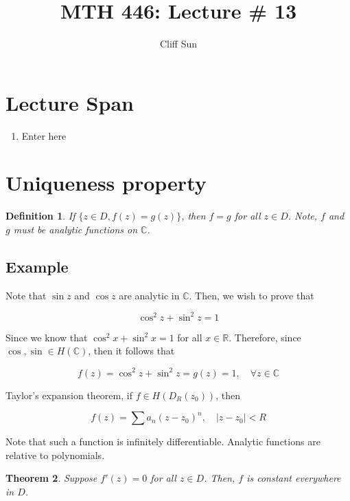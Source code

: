 \documentclass{article}
\title{MTH 446: Lecture \# 13}
\author{Cliff Sun}
\newtheorem{theorem}{Theorem}[section]
\newtheorem{definition}[theorem]{Definition}
\newtheorem{one minute paper}[theorem]{One Minute Paper}
\begin{document}
\maketitle

\section*{Lecture Span}
\begin{enumerate}
    \item Enter here
\end{enumerate}

\section*{Uniqueness property}

\begin{definition}
    If $\{z \in D, f(z) = g(z)\}$, then $f=g$ for all $z \in D$. Note, $f$ and $g$ must be analytic functions on $\mathbb{C}$. 
\end{definition}

\subsection*{Example}

Note that $\sin z$ and $\cos z$ are analytic in $\mathbb{C}$. Then, we wish to prove that 

\begin{equation}
    \cos^2 z+ \sin^2 z= 1
\end{equation}

Since we know that $\cos^2 x + \sin^2 x = 1$ for all $x\in \mathbb{R}$. Therefore, since $\cos,\sin \in H(\mathbb{C})$, then it follows that 

\begin{equation}
    f(z) = \cos^2z + \sin^2 z = g(z) = 1, \quad \forall z \in \mathbb{C}
\end{equation}

Taylor's expansion theorem, if $f \in H(D_R(z_0))$, then 

\begin{equation}
    f(z) = \sum a_n (z - z_0)^n, \quad |z-z_0| < R
\end{equation}

Note that such a function is infinitely differentiable. Analytic functions are relative to polynomials.  

\begin{theorem}
    Suppose $f'(z) = 0$ for all $z \in D$. Then, $f$ is constant everywhere in $D$.  
\end{theorem}
\end{document}
